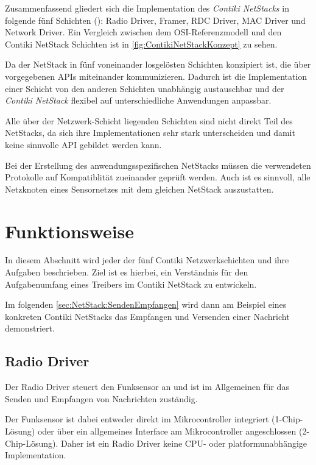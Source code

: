 	Zusammenfassend gliedert sich die Implementation des \emph{Contiki
	NetStacks} in folgende fünf Schichten (): Radio Driver,
	Framer, RDC Driver, MAC Driver und Network Driver.  Ein Vergleich
	zwischen dem OSI-Referenzmodell und den Contiki NetStack Schichten ist
	in \autoref{fig:ContikiNetStackKonzept} zu sehen.



	Da der \acl{NetStack} in fünf voneinander losgelösten Schichten
	konzipiert ist, die über vorgegebenen APIs miteinander kommunizieren.
	Dadurch ist die Implementation einer Schicht von den anderen Schichten
	unabhängig austauschbar und der \emph{Contiki NetStack} flexibel auf
	unterschiedliche Anwendungen anpassbar.

	Alle über der Netzwerk-Schicht liegenden Schichten sind nicht direkt
	Teil des \acl{NetStack}s, da sich ihre Implementationen sehr stark
	unterscheiden und damit keine sinnvolle API gebildet werden kann.

	Bei der Erstellung des anwendungsspezifischen \acl{NetStack}s müssen
	die verwendeten Protokolle auf Kompatiblität zueinander geprüft werden.
	Auch ist es sinnvoll, alle Netzknoten eines Sensornetzes mit dem
	gleichen \acl{NetStack} auszustatten.

\section{Funktionsweise}

	In diesem Abschnitt wird jeder der fünf Contiki Netzwerkschichten und
	ihre Aufgaben beschrieben. Ziel ist es hierbei, ein Verständnis für den
	Aufgabenumfang eines Treibers im Contiki NetStack zu entwickeln.

	Im folgenden \autoref{sec:NetStack:SendenEmpfangen} wird dann am
	Beispiel eines konkreten Contiki NetStacks das Empfangen und Versenden
	einer Nachricht demonstriert.

\subsection{Radio Driver}
\label{sec:NS:Funktionsweise:RadioDriver}

	Der Radio Driver steuert den Funksensor an und ist im Allgemeinen für
	das Senden und Empfangen von Nachrichten zuständig.

	Der Funksensor ist dabei entweder direkt im Mikrocontroller integriert
	(1-Chip-Lösung) oder über ein allgemeines Interface am Mikrocontroller
	angeschlossen (2-Chip-Lösung).  Daher ist ein Radio Driver keine CPU-
	oder platformunabhängige Implementation.

